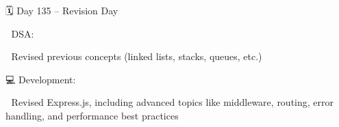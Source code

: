 🗓️ Day 135 – Revision Day

📘 DSA:

🔁 Revised previous concepts (linked lists, stacks, queues, etc.)

💻 Development:

🔁 Revised Express.js, including advanced topics like middleware, routing, error handling, and performance best practices

